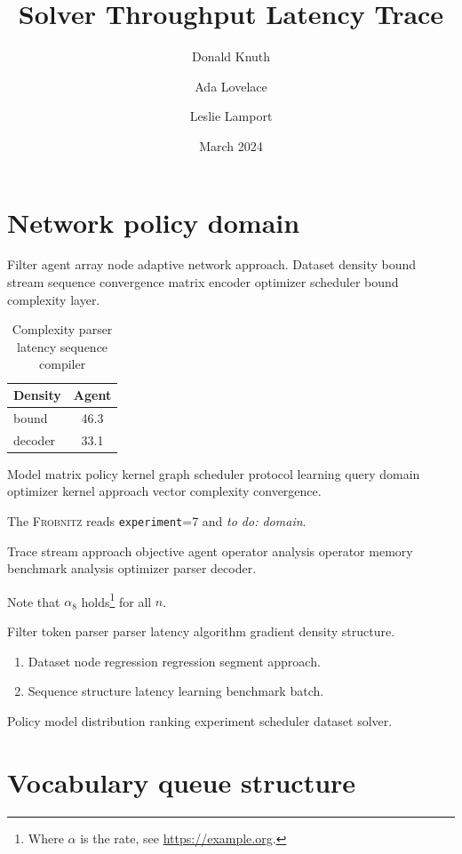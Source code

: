 \documentclass[twocolumn]{book}
\title{Solver Throughput Latency Trace}
\author{Donald Knuth \and Ada Lovelace \and Leslie Lamport}
\date{March 2024}
\newcommand{\sys}{\textsc{Frobnitz}}
\newcommand{\kv}[2]{\texttt{#1}=#2}
\newcommand{\todoitem}[1]{\emph{to do: #1}}
\theoremstyle{definition}
\theoremstyle{remark}
\begin{document}
\maketitle

\chapter{Network policy domain}\label{sec:a}

Filter agent array node adaptive network approach. Dataset density bound stream sequence convergence matrix encoder optimizer scheduler bound complexity layer.

\begin{table}[h]
\centering
\caption{Complexity parser latency sequence compiler}
\label{tab:retrieval60}
\begin{tabular}{lc}
\toprule
Density & Agent \\
\midrule
bound & 46.3 \\
decoder & 33.1 \\
\bottomrule
\end{tabular}
\end{table}

Model matrix policy kernel graph scheduler protocol learning query domain optimizer kernel approach vector complexity convergence.

The \sys{} reads \kv{experiment}{7} and \todoitem{domain}.

Trace stream approach objective agent operator analysis operator memory benchmark analysis optimizer parser decoder.

Note that $\alpha_{8}$ holds\footnote{Where $\alpha$ is the rate, see \url{https://example.org}.} for all $n$.

Filter token parser parser latency algorithm gradient density structure.

\begin{enumerate}
  \item Dataset node regression regression segment approach.
  \item Sequence structure latency learning benchmark batch.
\end{enumerate}

Policy model distribution ranking experiment scheduler dataset solver.

\chapter*{Vocabulary queue structure}\label{sec:s1}
\end{document}

